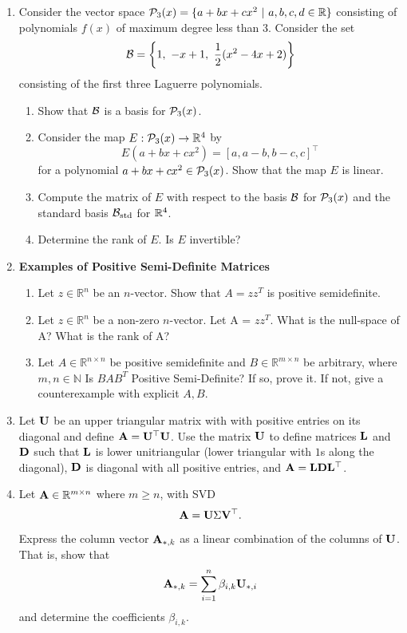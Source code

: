 \begin{enumerate}

    \item Consider the vector space $\CP_3(x) = \{a+bx+cx^2 \ | \ a,b,c,d\in\R\}$ consisting of polynomials $f(x)$ of maximum degree less than $3$. 
Consider the set $$\CB = \left\{1,\ -x+1,\ \frac{1}{2}(x^2-4x+2)\right\}$$
consisting of the first three Laguerre polynomials.
\begin{enumerate}
    \item Show that $\CB$ is a basis for $\CP_3(x)$. 
    \item Consider the map $E:\CP_3(x)\to\R^4$ by $$E(a+bx+cx^2) = [a, a-b, b-c,c]^\top$$
for a polynomial $a+bx+cx^2\in\CP_3(x)$. Show that the map $E$ is linear. 
\item Compute the matrix of $E$ with respect to the basis $\CB$ for $\CP_3(x)$ and the standard basis $\CB_\textnormal{std}$ for $\R^4$.
\item Determine the rank of $E$. Is $E$ invertible?
\end{enumerate}

\item \textbf{Examples of Positive Semi-Definite Matrices}

\begin{enumerate}
    \item Let $z \in \mathbb R^n$ be an $n$-vector. Show that $A = zz^T$ is positive semidefinite.
    \item Let $z \in \mathbb R^n$ be a non-zero $n$-vector. Let A = $zz^T$. What is the null-space of A? What is the rank of A?
    \item Let $A \in \mathbb R^{n \times n}$ be positive semidefinite and $B \in \mathbb R^{m \times n}$ be arbitrary, where $m, n \in \mathbb N$ Is $B A B^T$ Positive Semi-Definite? If so, prove it. If not, give a counterexample with explicit $A, B.$
\end{enumerate}



\item Let $\MU$ be an upper triangular matrix with with positive entries on its diagonal and define $\MA = \MU^\top\MU$. Use the matrix $\MU$ to define matrices $\ML$ and $\MD$ such that $\ML$ is lower unitriangular (lower triangular with $1$s along the diagonal), $\MD$ is diagonal with all positive entries, and $\MA = \ML\MD\ML^\top$. 

\item Let $\MA\in\mathbb{R}^{m\times n}$ where $m\geq n$, with SVD $$\MA=\MU\Sigma\MV^\top.$$
Express the column vector $\MA_{*,k}$ as a linear combination of the columns of $\MU$. That is, show that
$$\MA_{*,k}=\sum_{i=1}^n\beta_{i,k}\MU_{*,i}$$
and determine the coefficients $\beta_{i,k}$.
\end{enumerate}


